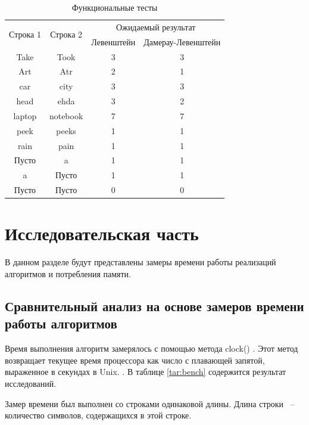 \documentclass[14pt,russian]{scrartcl}
\begin{document}
\begin{table}[htb]
	\caption{\centering Функциональные тесты}
	\centering
	\begin{tabular}{|c|c|c|c|}
		\hline
		\multirow{2}{*}{Строка 1} & \multirow{2}{*}{Строка 2} & \multicolumn{2}{c|}{Ожидаемый результат} \\ \cline{3-4} 
		&          & Левенштейн & Дамерау-Левенштейн \\ \hline
		Take   & Took     & 3          & 3                   \\ \hline
		Art    & Atr      & 2          & 1                   \\ \hline
		car    & city     & 3          & 3                   \\ \hline
		head   & ehda     & 3          & 2                   \\ \hline
		laptop & notebook & 7          & 7                   \\ \hline
		peek   & peeks    & 1          & 1                   \\ \hline
		rain   & pain     & 1          & 1                   \\ \hline
		Пусто   & a     &   1          & 1                   \\ \hline
		a   & Пусто     &   1          & 1                   \\ \hline
		Пусто   & Пусто     &   0          & 0                   \\ \hline
	\end{tabular}
	\label{tab:func_tests}
\end{table}
	
	\section{Исследовательская часть}
	В данном разделе будут представлены замеры времени работы реализаций алгоритмов и потребления памяти.
	
	\subsection{Сравнительный анализ на основе замеров времени работы алгоритмов}
	
	Время выполнения алгоритм замерялось с помощью метода clock() . Этот метод возвращает текущее время процессора как число с плавающей запятой, выраженное в секундах в Unix. . В таблице \ref{tar:bench} содержится результат исследований.

	Замер времени был выполнен со строками одинаковой длины. Длина строки ~--~ количество символов, содержащихся в этой строке.\
\end{document}
